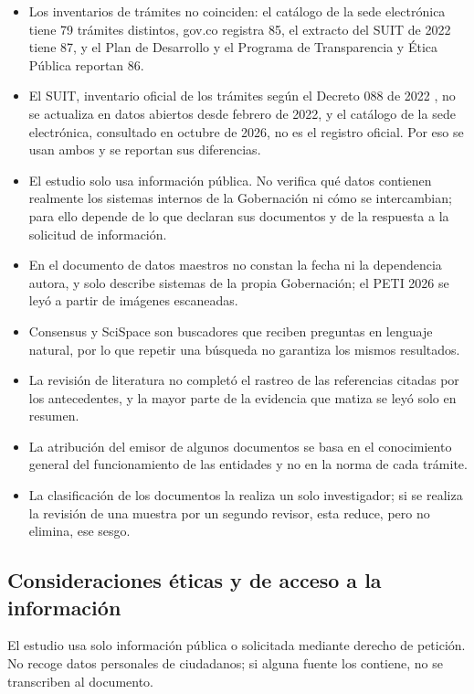 \begin{itemize}
\item Los inventarios de trámites no coinciden: el catálogo de la sede electrónica tiene 79 trámites distintos, gov.co registra 85, el extracto del SUIT de 2022 tiene 87, y el Plan de Desarrollo y el Programa de Transparencia y Ética Pública reportan 86.
\item El SUIT, inventario oficial de los trámites según el Decreto 088 de 2022 \parencite[Anexo 1, num. 2.3.2.1.1]{colombia2022decreto088}, no se actualiza en datos abiertos desde febrero de 2022, y el catálogo de la sede electrónica, consultado en octubre de 2026, no es el registro oficial. Por eso se usan ambos y se reportan sus diferencias.
\item El estudio solo usa información pública. No verifica qué datos contienen realmente los sistemas internos de la Gobernación ni cómo se intercambian; para ello depende de lo que declaran sus documentos y de la respuesta a la solicitud de información.
\item En el documento de datos maestros no constan la fecha ni la dependencia autora, y solo describe sistemas de la propia Gobernación; el PETI 2026 se leyó a partir de imágenes escaneadas.
\item Consensus y SciSpace son buscadores que reciben preguntas en lenguaje natural, por lo que repetir una búsqueda no garantiza los mismos resultados.
\item La revisión de literatura no completó el rastreo de las referencias citadas por los antecedentes, y la mayor parte de la evidencia que matiza se leyó solo en resumen.
\item La atribución del emisor de algunos documentos se basa en el conocimiento general del funcionamiento de las entidades y no en la norma de cada trámite.
\item La clasificación de los documentos la realiza un solo investigador; si se realiza la revisión de una muestra por un segundo revisor, esta reduce, pero no elimina, ese sesgo.
\end{itemize}

\subsection{Consideraciones éticas y de acceso a la información}

El estudio usa solo información pública o solicitada mediante derecho de petición. No recoge datos personales de ciudadanos; si alguna fuente los contiene, no se transcriben al documento.
